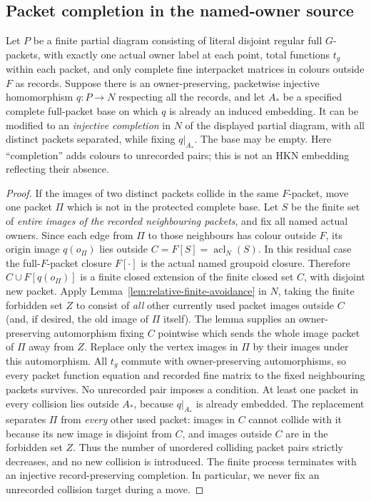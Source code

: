 \subsection{Packet completion in the named-owner source}

\begin{lemma}
\label{lem:packet-collision}
Let $P$ be a finite partial diagram consisting of literal disjoint
regular full $G$-packets, with exactly one actual owner label at
each point, total functions $t_g$ within each packet, and only
complete fine interpacket matrices in colours outside $F$ as
records.  Suppose there is an owner-preserving, packetwise injective
homomorphism $q:P\to N$ respecting all the records, and let $A_\ast$
be a specified complete full-packet base on which $q$ is already
an induced embedding.  It can be modified to an \emph{injective
completion} in $N$ of the displayed partial diagram, with all
distinct packets separated, while fixing $q|_{A_\ast}$.
The base may be empty.  Here ``completion'' adds colours to
unrecorded pairs; this is not an HKN embedding reflecting their
absence.
\end{lemma}
\begin{proof}
If the images of two distinct packets collide in the same
$F$-packet, move one packet $\Pi$ which is not in the protected
complete base.  Let $S$ be the finite set of \emph{entire images of
the recorded neighbouring packets}, and fix all named actual
owners.  Since each edge from $\Pi$ to those neighbours has colour
outside $F$, its origin image $q(o_\Pi)$ lies outside
$C=F[S]=\operatorname{acl}_N(S)$.  In this residual case the
full-$F$-packet closure $F[\cdot]$ is the actual named groupoid
closure.  Therefore $C\cup F[q(o_\Pi)]$ is a finite closed
extension of the finite closed set $C$, with disjoint new packet.
Apply Lemma~\ref{lem:relative-finite-avoidance} in $N$, taking
the finite forbidden set $Z$ to consist of \emph{all} other
currently used packet images outside $C$ (and, if desired, the
old image of $\Pi$ itself).  The lemma supplies an owner-preserving
automorphism fixing $C$ pointwise which sends the whole image
packet of $\Pi$ away from $Z$.  Replace only the vertex images
in $\Pi$ by their images under this automorphism.  All $t_g$
commute with owner-preserving automorphisms, so every packet
function equation and recorded fine matrix to the fixed neighbouring
packets survives.  No unrecorded pair imposes a condition.
At least one packet in every collision lies outside $A_\ast$,
because $q|_{A_\ast}$ is already embedded.  The replacement separates
$\Pi$ from \emph{every} other used packet: images in $C$ cannot
collide with it because its new image is disjoint from $C$, and
images outside $C$ are in the forbidden set $Z$.  Thus the number
of unordered colliding packet pairs strictly decreases, and no new
collision is introduced.  The finite process terminates with an
injective record-preserving completion.  In particular, we
never fix an unrecorded collision target during a move.
\end{proof}


